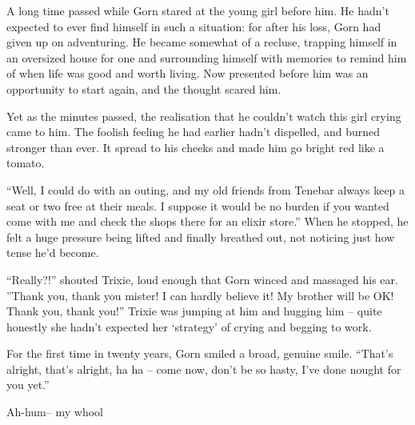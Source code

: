 A long time passed while Gorn stared at the young girl before him. He hadn't
expected to ever find himself in such a situation: for after his loss, Gorn had
given up on adventuring. He became somewhat of a recluse, trapping himself in an
oversized house for one and surrounding himself with memories to remind him of
when life was good and worth living. Now presented before him was an opportunity
to start again, and the thought scared him.

Yet as the minutes passed, the realisation that he couldn't watch this girl
crying came to him. The foolish feeling he had earlier hadn't dispelled, and
burned stronger than ever. It spread to his cheeks and made him go bright red
like a tomato.

``Well, I could do with an outing, and my old friends from Tenebar always keep a
seat or two free at their meals. I suppose it would be no burden if you wanted
come with me and check the shops there for an elixir store.'' When he stopped,
he felt a huge pressure being lifted and finally breathed out, not noticing just
how tense he'd become.

``Really?!'' shouted Trixie, loud enough that Gorn winced and massaged his ear.
''Thank you, thank you mister! I can hardly believe it! My brother will be OK!
Thank you, thank you!'' Trixie was jumping at him and hugging him -- quite
honestly she hadn't expected her `strategy' of crying and begging to work.

For the first time in twenty years, Gorn smiled a broad, genuine smile. ``That's
alright, that's alright, ha ha -- come now, don't be so hasty, I've done nought
for you yet.''

Ah-hum-- my whool
